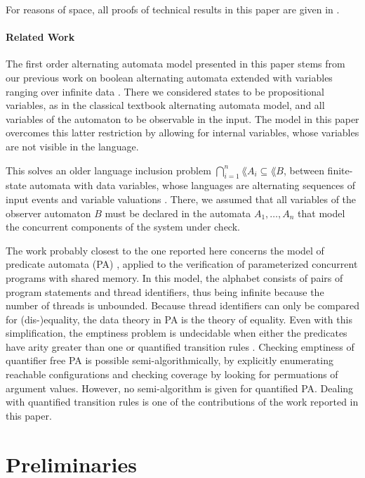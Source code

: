 For reasons of space, all proofs of technical results in this paper
are given in \cite{IosifXu18ArXiv}.

\paragraph{\bf Related Work} 
The first order alternating automata model presented in this paper
stems from our previous work on boolean alternating automata extended
with variables ranging over infinite data \cite{IosifXu18}. There we
considered states to be propositional variables, as in the classical
textbook alternating automata model, and all variables of the
automaton to be observable in the input. The model in this paper
overcomes this latter restriction by allowing for internal variables,
whose variables are not visible in the language. 

This solves an older language inclusion problem
$\bigcap_{i=1}^n\lang{A_i} \subseteq \lang{B}$, between finite-state
automata with data variables, whose languages are alternating
sequences of input events and variable valuations
\cite{IosifRV16}. There, we assumed that all variables of the observer
automaton $B$ must be declared in the automata $A_1, \ldots, A_n$ that
model the concurrent components of the system under check.

The work probably closest to the one reported here concerns the model
of predicate automata (PA) \cite{Farzan15,Farzan16,KincaidPhD},
applied to the verification of parameterized concurrent programs with
shared memory. In this model, the alphabet consists of pairs of
program statements and thread identifiers, thus being infinite because
the number of threads is unbounded. Because thread identifiers can
only be compared for (dis-)equality, the data theory in PA is the
theory of equality. Even with this simplification, the emptiness
problem is undecidable when either the predicates have arity greater
than one \cite{Farzan15} or quantified transition rules
\cite{KincaidPhD}. Checking emptiness of quantifier free PA is
possible semi-algorithmically, by explicitly enumerating reachable
configurations and checking coverage by looking for permuations of
argument values. However, no semi-algorithm is given for quantified
PA.  Dealing with quantified transition rules is one of the
contributions of the work reported in this paper. 

\section{Preliminaries}

